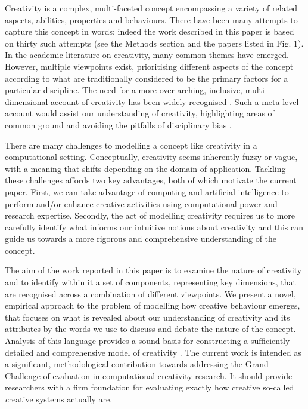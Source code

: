 \documentclass[10pt,letterpaper]{article}
\begin{document}
Creativity is a complex, multi-faceted concept encompassing a variety of related aspects, abilities, properties and behaviours. There have been many attempts to capture this concept in words; indeed the work described in this paper is based on thirty such attempts (see the Methods section and the papers listed in Fig. 1).  %
In the academic literature on creativity, many common themes have emerged. 
However, multiple viewpoints exist, prioritising different aspects of the concept according to what are traditionally considered to be the primary factors for a particular discipline. 
The need for a more over-arching, inclusive, multi-dimensional account of creativity has been widely recognised \cite{rhodes61,torrance67,plucker04defn,kaufman09}. Such a meta-level account would assist our understanding of creativity, highlighting areas of common ground and avoiding the pitfalls of disciplinary bias \cite{hennessey10,plucker04}.

There are many challenges to modelling a concept like creativity in a computational setting. Conceptually, creativity seems inherently fuzzy or vague, with a meaning that shifts depending on the domain of application. Tackling these challenges affords two key advantages, both of which motivate the current paper. First, we can take advantage of computing and artificial intelligence to perform and/or enhance creative activities using computational power and research expertise. Secondly, the act of modelling creativity requires us to more carefully identify what informs our intuitive notions about creativity and this can guide us towards a more rigorous and comprehensive understanding of the concept.  

The aim of the work reported in this paper is to examine the nature of creativity and to identify within it a set of components, representing key dimensions, that are recognised across a combination of different viewpoints. We present a novel, empirical approach to the problem of modelling how creative behaviour emerges, that focuses on what is revealed about our understanding of creativity and its attributes by the words we use to discuss and debate the nature of the concept. Analysis of this language provides a sound basis for constructing a sufficiently detailed and comprehensive model of creativity \cite{lakoff87,wittgenstein58}. The current work is intended as a significant, methodological contribution towards addressing the Grand Challenge of evaluation in computational creativity research. It should provide researchers with a firm foundation for evaluating exactly how creative so-called {\emph creative systems} actually are.
\end{document}
